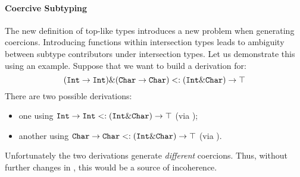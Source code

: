 
\paragraph{Coercive Subtyping}
The new definition of top-like types introduces a new problem when generating coercions. 
Introducing functions within intersection types leads to ambiguity between subtype contributors 
under intersection types.
Let us demonstrate this using an example.
Suppose that we want to build a derivation for:  
\[(\texttt{Int} \to \texttt{Int}) \& (\texttt{Char} \to \texttt{Char}) <: (\texttt{Int} \& \texttt{Char}) \to \top\]
There are two possible derivations: 

\begin{itemize}

\item one using $\texttt{Int} \to \texttt{Int} <: (\texttt{Int} \& \texttt{Char}) \to \top$ 
(via );

\item another using $\texttt{Char} \to \texttt{Char} <: (\texttt{Int} \& \texttt{Char}) \to \top$
(via ).

\end{itemize}

\noindent Unfortunately the two derivations generate \emph{different}
coercions.  Thus, without further changes in \name, this would be a
source of incoherence.



